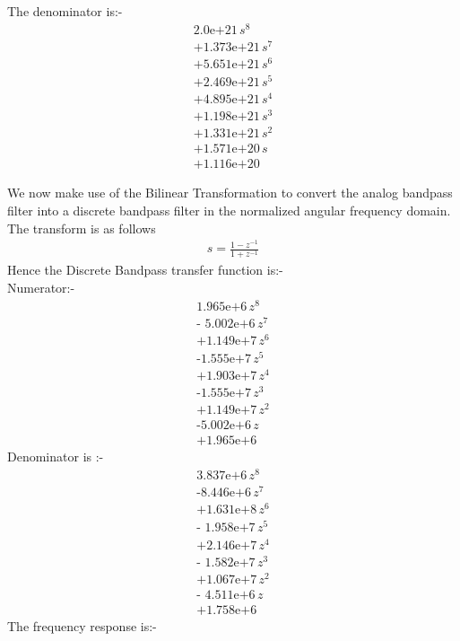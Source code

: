 \documentclass[12pt, letterpaper,]{article}
\begin{document}
\begin{itemize}
The denominator is:-\\
\begin{align*}
\text{2.0e+21}\,s^8 \\+\text{1.373e+21}\,s^7 \\+\text{5.651e+21}\,s^6 \\+\text{2.469e+21}\,s^5\\ +\text{4.895e+21}\,s^4 \\+\text{1.198e+21}\,s^3 \\+\text{1.331e+21}\,s^2 \\+\text{1.571e+20}\,s\\+\text{1.116e+20}
\end{align*}

We now make use of the Bilinear Transformation to convert the analog bandpass
filter into a discrete bandpass filter in the normalized angular frequency domain. The transform is as follows
\begin{align*}
    s = \frac{1-z^{-1}}{1+z^{-1}}
\end{align*}
Hence the Discrete Bandpass transfer function is:-\\
Numerator:-
\begin{align*}
    \text{1.965e+6}\,z^8 \\\text{- 5.002e+6}\,z^7 \\+\text{1.149e+7}\,z^6 \\\text{-1.555e+7}\,z^5 \\+\text{1.903e+7}\,z^4 \\\text{-1.555e+7}\,z^3 \\+\text{1.149e+7}\,z^2 \\\text{-5.002e+6}\,z\\+\text{1.965e+6}
\end{align*}
Denominator is :-
\begin{align*}
    \text{3.837e+6}\,z^8 \\\text{-8.446e+6}\,z^7 \\+\text{1.631e+8}\,z^6 \\\text{- 1.958e+7}\,z^5 \\+\text{2.146e+7}\,z^4 \\\text{- 1.582e+7}\,z^3 \\+\text{1.067e+7}\,z^2\\ \text{- 4.511e+6}\,z\\+\text{1.758e+6}
\end{align*}
\newpage
The frequency response is:-
\begin{figure}[!ht]

\end{figure}
\end{itemize}
\end{document}

